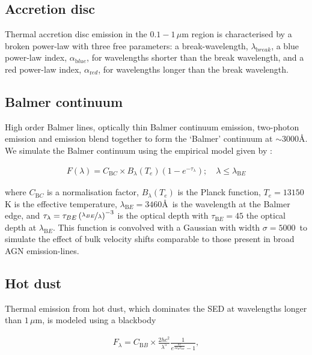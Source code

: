 \subsection{Accretion disc}

Thermal accretion disc emission in the $0.1 - 1$\,$\mu$m region is characterised by a broken power-law with three free parameters: a break-wavelength, $\lambda_{\mathrm break}$, a blue power-law index, $\alpha_{\mathrm blue}$, for wavelengths shorter than the break wavelength, and a red power-law index, $\alpha_{\mathrm red}$, for wavelengths longer than the break wavelength.

\subsection{Balmer continuum}

High order Balmer lines, optically thin Balmer continuum emission, two-photon emission and  emission blend together to form the `Balmer' continuum at $\sim3000$\AA.
We simulate the Balmer continuum using the empirical model given by \citet{grandi82}: 

\begin{eqnarray}
  F(\lambda) = C_{\mathrm BC} \times B_\lambda(T_e)(1-e^{-\tau_\lambda}); \quad \lambda \leq \lambda_{\mathrm BE}
\end{eqnarray}

where $C_{\mathrm BC}$ is a normalisation factor, $B_\lambda(T_e)$ is the Planck function, $T_e=13150$K is the effective temperature, $\lambda_{\mathrm BE}=3460$\AA\, is the wavelength at the Balmer edge, and $\tau_\lambda = \tau_{BE}\left( \nicefrac{\lambda_{BE}} {\lambda} \right)^{-3}$ is the optical depth with $\tau_{\mathrm BE}=45$ the optical depth at $\lambda_{\mathrm BE}$. 
This function is convolved with a Gaussian with width $\sigma=5000$\kms\, to simulate the effect of bulk velocity shifts comparable to those present in broad AGN emission-lines. 

\subsection{Hot dust}

Thermal emission from hot dust, which dominates the SED at wavelengths longer than $1$\,$\mu$m, is modeled using a blackbody

\begin{eqnarray}  
  F_\lambda = C_{\mathrm BB} \times \frac{2 hc^2}{\lambda^5}\frac{1}{ e^{\frac{hc}{\lambda k_\mathrm{B}T_{\mathrm BB}}} - 1}, 
\end{eqnarray}


